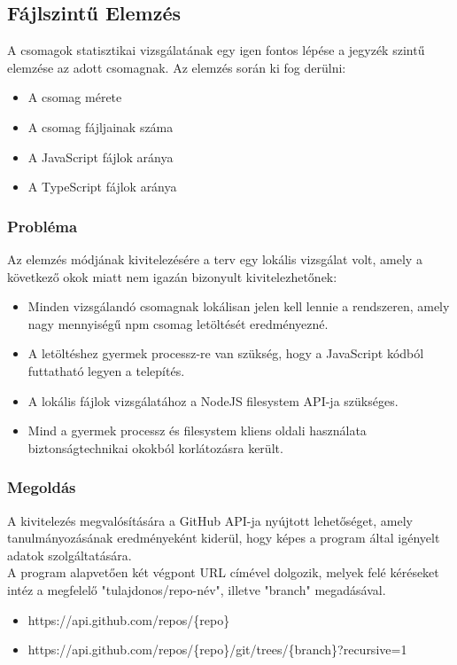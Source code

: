 \subsection{Fájlszintű Elemzés} 
A csomagok statisztikai vizsgálatának egy igen fontos lépése a jegyzék szintű elemzése az adott csomagnak. Az elemzés során ki fog derülni:
\begin{itemize}
	\item A csomag mérete
	\item A csomag fájljainak száma
	\item A JavaScript fájlok aránya
	\item A TypeScript fájlok aránya
\end{itemize}

\subsubsection{Probléma}
Az elemzés módjának kivitelezésére a terv egy lokális vizsgálat volt, amely a következő okok miatt nem igazán bizonyult kivitelezhetőnek:
\begin{itemize}
	\item Minden vizsgálandó csomagnak lokálisan jelen kell lennie a rendszeren, amely nagy mennyiségű npm csomag letöltését eredményezné.
	\item A letöltéshez gyermek processz-re van szükség, hogy a JavaScript kódból futtatható legyen a telepítés.
	\item A lokális fájlok vizsgálatához a NodeJS filesystem API-ja szükséges.
	\item Mind a gyermek processz és filesystem kliens oldali használata biztonságtechnikai okokból korlátozásra került.
\end{itemize}

\subsubsection{Megoldás}
A kivitelezés megvalósítására a GitHub API-ja nyújtott lehetőséget, amely tanulmányozásának eredményeként kiderül, hogy képes a program által igényelt adatok szolgáltatására.\\

A program alapvetően két végpont URL címével dolgozik, melyek felé kéréseket intéz a megfelelő "tulajdonos/repo-név", illetve "branch" megadásával.
\begin{itemize}
	\item https://api.github.com/repos/\{repo\}
	\item https://api.github.com/repos/\{repo\}/git/trees/\{branch\}?recursive=1
\end{itemize}


